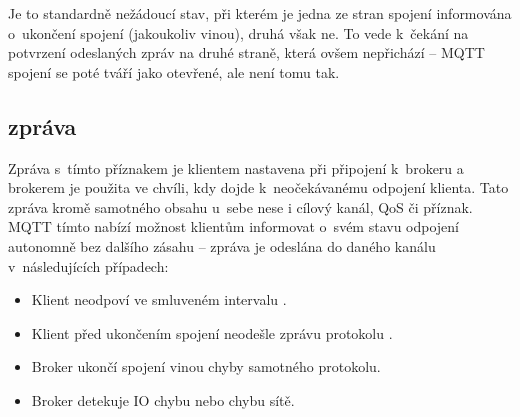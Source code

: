 Je to standardně nežádoucí stav, při kterém je jedna ze stran spojení informována o~ukončení spojení (jakoukoliv
vinou), druhá však ne.
To vede k~čekání na potvrzení odeslaných zpráv na druhé straně, která ovšem nepřichází -- MQTT spojení se poté
tváří jako otevřené, ale není tomu tak.

\subsection{ zpráva}\label{subsec:last-will-zprava}
Zpráva s~tímto příznakem je klientem nastavena při připojení k~brokeru a brokerem je použita ve chvíli, kdy dojde
k~neočekávanému odpojení klienta.
Tato zpráva  kromě samotného obsahu u~sebe nese i cílový kanál, QoS či 
příznak.
MQTT tímto nabízí možnost klientům informovat o~svém stavu odpojení autonomně bez dalšího zásahu --
 zpráva je odeslána do daného kanálu v~následujících případech:
\begin{itemize}
    \item Klient neodpoví ve smluveném intervalu .
    \item Klient před ukončením spojení neodešle zprávu protokolu .
    \item Broker ukončí spojení vinou chyby samotného protokolu.
    \item Broker detekuje IO chybu nebo chybu sítě.
\end{itemize}

